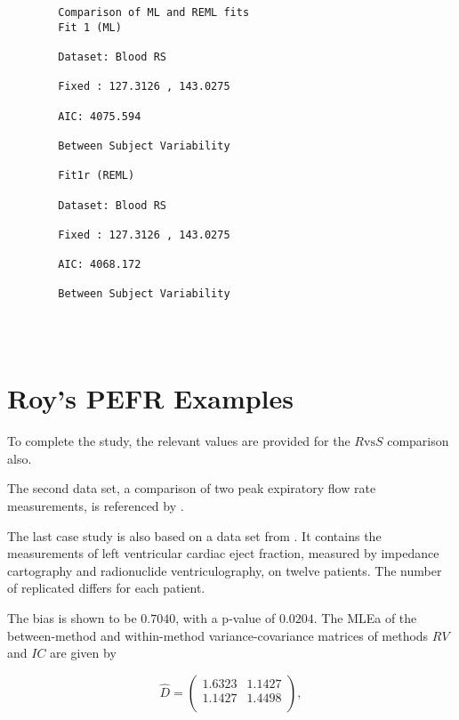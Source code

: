 \documentclass[12pt, a4paper]{report}
\theoremstyle{plain}
\theoremstyle{definition}
\theoremstyle{remark}
\begin{document}
	
	\begin{framed}	\begin{verbatim}	
		
		
		
		Comparison of ML and REML fits
		Fit 1 (ML)
		
		Dataset: Blood RS
		
		Fixed : 127.3126 , 143.0275
		
		AIC: 4075.594
		
		Between Subject Variability
		
		Fit1r (REML)
		
		Dataset: Blood RS
		
		Fixed : 127.3126 , 143.0275
		
		AIC: 4068.172
		
		Between Subject Variability
		
		
		
		\end{verbatim}
	\end{framed}

	
\section{Roy's PEFR Examples}

	
	
	To complete the study, the relevant values are provided for the $R \mbox{vs} S$ comparison also.
	
	
	The second data set, a comparison of two peak expiratory flow rate measurements, is referenced by \citet{BA86}.
	
	
	The last case study is also based on a data set from  \citet{BA99}. It contains the measurements of left ventricular cardiac eject fraction, measured by impedance cartography and radionuclide ventriculography, on twelve patients.
	The number of replicated differs for each patient.
	
	The bias is shown to be $0.7040$, with a p-value of $0.0204$. The MLEa of the between-method and within-method variance-covariance matrices of methods $RV$ and $IC$ are given by
	
	\begin{equation}\hat{D}=\left(
	\begin{array}{cc}
	1.6323 & 1.1427 \\
	1.1427 & 1.4498 \\
	\end{array}
	\right),
	\end{equation}
	
\end{document}
